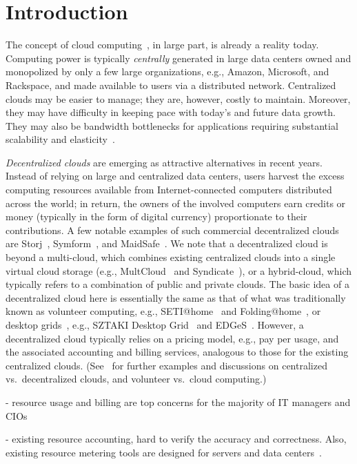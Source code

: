 \section{Introduction} \label{sect:intro}

The concept of cloud computing~\cite{AFG+10}, in large part, is already a reality today.
Computing power is typically {\em centrally} generated in large data centers owned and monopolized by only a few large organizations, e.g., Amazon, Microsoft, and Rackspace, and made available to users via a distributed network.
Centralized clouds may be easier to manage; they are, however, costly to maintain.
Moreover, they may have difficulty in keeping pace with today's and future data growth.
They may also be bandwidth bottlenecks for applications requiring substantial scalability and elasticity~\cite{symform-slide,techrepublic}.

{\em Decentralized clouds} are emerging as attractive alternatives in recent years.
Instead of relying on large and centralized data centers, users harvest the excess computing resources available from Internet-connected computers distributed across the world; in return, the owners of the involved computers earn credits or money (typically in the form of digital currency) proportionate to their contributions.
A few notable examples of such commercial decentralized clouds are Storj~\cite{Storj}, Symform~\cite{Symform}, and MaidSafe~\cite{MaidSafe}.
We note that a decentralized cloud is beyond a multi-cloud, which combines existing centralized clouds into a single virtual cloud storage (e.g., MultCloud~\cite{MultCloud} and Syndicate~\cite{Syndicate}), or a hybrid-cloud, which typically refers to a combination of public and private clouds.
The basic idea of a decentralized cloud here is essentially the same as that of what was traditionally known as volunteer computing, e.g., SETI@home~\cite{Seti@home} and Folding@home~\cite{Folding@home}, or desktop grids~\cite{CKB+07}, e.g., SZTAKI Desktop Grid~\cite{sztaki} and EDGeS~\cite{edges}.
However, a decentralized cloud typically relies on a pricing model, e.g., pay per usage, and the associated accounting and billing services, analogous to those for the existing centralized clouds.
(See~\cite{DP12,MKK13} for further examples and discussions on centralized vs.\ decentralized clouds, and volunteer vs.\ cloud computing.)

- resource usage and billing are top concerns for the majority of IT managers and CIOs 

- existing resource accounting, hard to verify the accuracy and correctness. Also, existing resource metering tools are designed for servers and data centers~\cite{?}.

